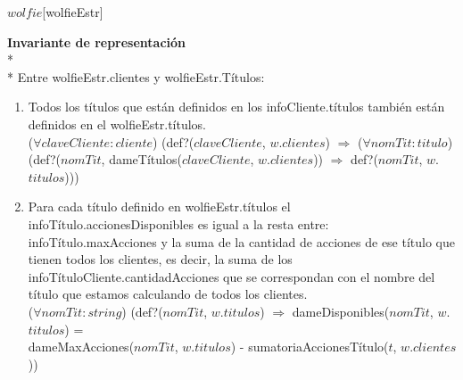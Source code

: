 \begin{Representacion}
\begin{Estructura}{$wolfie$}[wolfieEstr]
  \end{Estructura}
  \textbf{Invariante de representación}\\* \\* Entre wolfieEstr.clientes y wolfieEstr.Títulos:
 \begin{enumerate}
 	\item Todos los títulos que están definidos en los infoCliente.títulos también están definidos en el wolfieEstr.títulos.\\
    ($\forall claveCliente:cliente$) (def?($claveCliente$, $w$.$clientes$) $\Rightarrow$ ($\forall nomTit:titulo$)\\ (def?($nomTit$, dameTítulos($claveCliente$, $w$.$clientes$)) $\Rightarrow$ def?($nomTit$, $w$.$titulos$)))
    \item Para cada título definido en wolfieEstr.títulos el infoTítulo.accionesDisponibles es igual a la resta entre: infoTítulo.maxAcciones y la suma de la cantidad de acciones de ese título que tienen todos los clientes, es decir, la suma de los infoTítuloCliente.cantidadAcciones que se correspondan con el nombre del título que estamos calculando de todos los clientes.\\
    ($\forall nomTit:string$) (def?($nomTit$, $w$.$titulos$) $\Rightarrow$ dameDisponibles($nomTit$, $w$.$titulos$) = \\dameMaxAcciones($nomTit$, $w$.$titulos$) - sumatoriaAccionesTítulo($t$, $w$.$clientes$))
    

\end{enumerate}
\end{Representacion}
